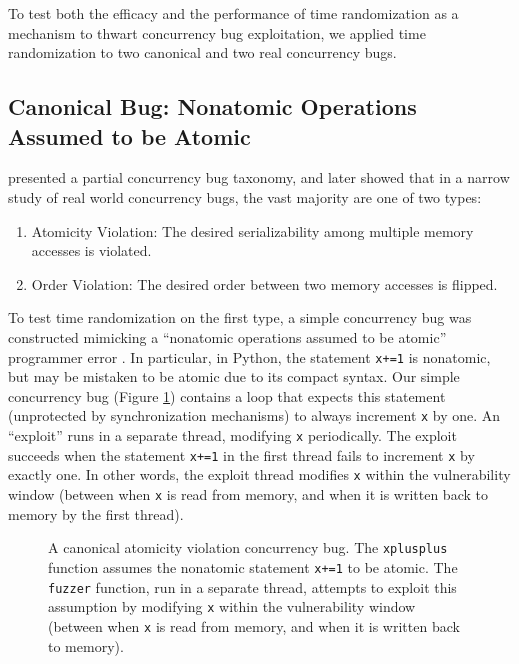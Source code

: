 To test both the efficacy and the performance of time randomization as a mechanism to thwart concurrency bug exploitation, we applied time randomization to two canonical and two real concurrency bugs.
\subsection{Canonical Bug: Nonatomic Operations Assumed to be Atomic}
\cite{Farchi2003} presented a partial concurrency bug taxonomy, and \cite{Lu2008} later showed that in a narrow study of real world concurrency bugs, the vast majority are one of two types:
\begin{enumerate}
	\item Atomicity Violation: The desired serializability among multiple memory accesses is violated.
	\item Order Violation: The desired order between two memory accesses is flipped.
\end{enumerate}
To test time randomization on the first type, a simple concurrency bug was
constructed mimicking a ``nonatomic operations assumed to be atomic'' programmer error \cite{Farchi2003}.
In particular, in Python, the statement \texttt{x+=1} is nonatomic, but may be mistaken to be atomic due to its compact syntax.
Our simple concurrency bug (Figure \ref{fig_nonatomic}) contains a loop that expects this statement (unprotected by synchronization mechanisms) to always increment \texttt{x} by one.
An ``exploit'' runs in a separate thread, modifying \texttt{x} periodically.
The exploit succeeds when the statement \texttt{x+=1} in the first thread fails to increment \texttt{x} by exactly one.
In other words, the exploit thread modifies \texttt{x} within the vulnerability window (between when \texttt{x} is read from memory, and when it is written back to memory by the first thread).
\begin{figure}
	
	\caption{A canonical atomicity violation concurrency bug.  The \texttt{xplusplus} function assumes the nonatomic statement \texttt{x+=1} to be atomic.  The \texttt{fuzzer} function, run in a separate thread, attempts to exploit this assumption by modifying \texttt{x} within the vulnerability window (between when \texttt{x} is read from memory, and when it is written back to memory).}
	\label{fig_nonatomic}
\end{figure}

